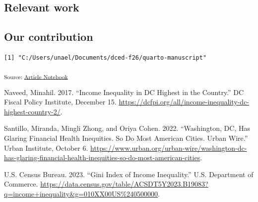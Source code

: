 \documentclass[
  letterpaper,
  DIV=11,
  numbers=noendperiod]{scrartcl}
\newlength{\cslhangindent}
\newenvironment{CSLReferences}[2] %
 {\begin{list}{}{%
  \setlength{\itemindent}{0pt}
  \setlength{\leftmargin}{0pt}
  \setlength{\parsep}{0pt}
  \ifodd #1
   \setlength{\leftmargin}{\cslhangindent}
   \setlength{\itemindent}{-1\cslhangindent}
  \fi
  \setlength{\itemsep}{#2\baselineskip}}}
 {\end{list}}
\begin{document}
\subsection{Relevant work}\label{relevant-work}

\subsection{Our contribution}\label{our-contribution}

\begin{verbatim}
[1] "C:/Users/unael/Documents/dced-f26/quarto-manuscript"
\end{verbatim}

\textsubscript{Source:
\href{https://sds-capstone.github.io/dced-f26/test.qmd.html}{Article
Notebook}}

\protect{}\label{refs}
\begin{CSLReferences}{1}{1}
Naveed, Minahil. 2017. {``Income Inequality in {DC} Highest in the
Country.''} DC Fiscal Policy Institute, December 15.
\url{https://dcfpi.org/all/income-inequality-dc-highest-country-2/}.

Santillo, Miranda, Mingli Zhong, and Oriya Cohen. 2022. {``Washington,
{DC}, Has Glaring Financial Health Inequities. So Do Most {American}
Cities. Urban Wire.''} Urban Institute, October 6.
\url{https://www.urban.org/urban-wire/washington-dc-has-glaring-financial-health-inequities-so-do-most-american-cities}.

U.S. Census Bureau. 2023. {``Gini Index of Income Inequality.''} U.S.
Department of Commerce.
\url{https://data.census.gov/table/ACSDT5Y2023.B19083?q=income+inequality&g=010XX00US\%240500000}.

\end{CSLReferences}
\end{document}
